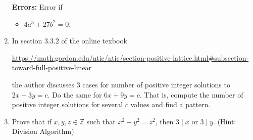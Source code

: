\documentclass[12pt]{article}
\newcommand{\Z}{\mathbb{Z}}
\begin{document}
\begin{enumerate}
{\begin{minipage}{.9\textwidth}
	\textbf{Errors:} Error if 
	\begin{itemize}
		\item $4a^3+27b^2=0$.
	\end{itemize} 
	\end{minipage}}
\item In section 3.3.2 of the online texbook \begin{center}
	\url{https://math.gordon.edu/ntic/ntic/section-positive-lattice.html#subsection-toward-full-positive-linear}
\end{center} the author discusses 3 cases for number of positive integer solutions to $2x+3y=c$. Do the same for $6x+9y=c$. That is, compute the number of positive integer solutions for several $c$ values and find a pattern.

\item Prove that if $x,y,z\in\Z$ such that $x^2+y^2=z^2$, then $3\mid x$ or $3\mid y$. (Hint: Division Algorithm)
	
	
\end{enumerate}
		
\end{document}
